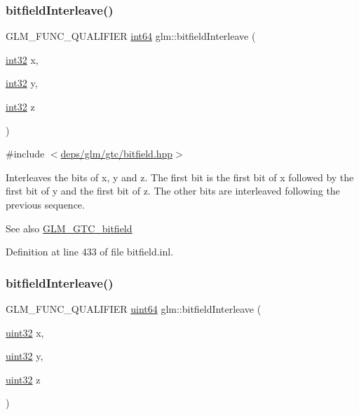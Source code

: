 \subsubsection{\texorpdfstring{bitfield\+Interleave()}{bitfieldInterleave()}\hspace{0.1cm}{\footnotesize\ttfamily [11/16]}}
{\footnotesize\ttfamily G\+L\+M\+\_\+\+F\+U\+N\+C\+\_\+\+Q\+U\+A\+L\+I\+F\+I\+ER \hyperlink{group__gtc__type__precision_ga435d75819cce297cc5fa21bd84ef89a5}{int64} glm\+::bitfield\+Interleave (\begin{DoxyParamCaption}\item[{\hyperlink{group__gtc__type__precision_ga632d8b25f6b61659f39ea4321fab92a4}{int32}}]{x,  }\item[{\hyperlink{group__gtc__type__precision_ga632d8b25f6b61659f39ea4321fab92a4}{int32}}]{y,  }\item[{\hyperlink{group__gtc__type__precision_ga632d8b25f6b61659f39ea4321fab92a4}{int32}}]{z }\end{DoxyParamCaption})}



{\ttfamily \#include $<$\hyperlink{bitfield_8hpp}{deps/glm/gtc/bitfield.\+hpp}$>$}

Interleaves the bits of x, y and z. The first bit is the first bit of x followed by the first bit of y and the first bit of z. The other bits are interleaved following the previous sequence.

\begin{DoxySeeAlso}{See also}
\hyperlink{group__gtc__bitfield}{G\+L\+M\+\_\+\+G\+T\+C\+\_\+bitfield} 
\end{DoxySeeAlso}


Definition at line 433 of file bitfield.\+inl.

\mbox{\label{group__gtc__bitfield_ga7c10eb37f608365cfaef5ca2c476e1ce}} 
\subsubsection{\texorpdfstring{bitfield\+Interleave()}{bitfieldInterleave()}\hspace{0.1cm}{\footnotesize\ttfamily [12/16]}}
{\footnotesize\ttfamily G\+L\+M\+\_\+\+F\+U\+N\+C\+\_\+\+Q\+U\+A\+L\+I\+F\+I\+ER \hyperlink{group__gtc__type__precision_gae3632bf9b37da66233d78930dd06378a}{uint64} glm\+::bitfield\+Interleave (\begin{DoxyParamCaption}\item[{\hyperlink{group__gtc__type__precision_ga202b6a53c105fcb7e531f9b443518451}{uint32}}]{x,  }\item[{\hyperlink{group__gtc__type__precision_ga202b6a53c105fcb7e531f9b443518451}{uint32}}]{y,  }\item[{\hyperlink{group__gtc__type__precision_ga202b6a53c105fcb7e531f9b443518451}{uint32}}]{z }\end{DoxyParamCaption})}



